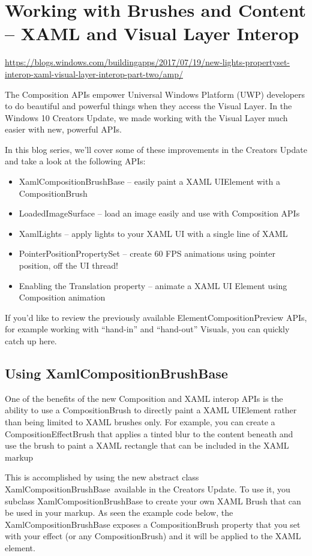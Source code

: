\section{Working with Brushes and Content – XAML and Visual Layer Interop}
\url{https://blogs.windows.com/buildingapps/2017/07/19/new-lights-propertyset-interop-xaml-visual-layer-interop-part-two/amp/}

The Composition APIs empower Universal Windows Platform (UWP) developers to do beautiful and powerful things when they access the Visual Layer. In the Windows 10 Creators Update, we made working with the Visual Layer much easier with new, powerful APIs.

In this blog series, we’ll cover some of these improvements in the Creators Update and take a look at the following APIs:

\begin{itemize}
	\item XamlCompositionBrushBase – easily paint a XAML UIElement with a CompositionBrush
	\item LoadedImageSurface – load an image easily and use with Composition APIs
	\item XamlLights – apply lights to your XAML UI with a single line of XAML
	\item PointerPositionPropertySet – create 60 FPS animations using pointer position, off the UI thread!
	\item Enabling the Translation property – animate a XAML UI Element using Composition animation
\end{itemize}

If you’d like to review the previously available ElementCompositionPreview APIs, for example working with “hand-in” and “hand-out” Visuals, you can quickly catch up here.

\subsection{Using XamlCompositionBrushBase}
One of the benefits of the new Composition and XAML interop APIs is the ability to use a CompositionBrush to directly paint a XAML UIElement rather than being limited to XAML brushes only. For example, you can create a CompositionEffectBrush that applies a tinted blur to the content beneath and use the brush to paint a XAML rectangle that can be included in the XAML markup

This is accomplished by using the new abstract class XamlCompositionBrushBase available in the Creators Update. To use it, you subclass XamlCompositionBrushBase to create your own XAML Brush that can be used in your markup. As seen the example code below, the XamlCompositionBrushBase exposes a CompositionBrush property that you set with your effect (or any CompositionBrush) and it will be applied to the XAML element.

